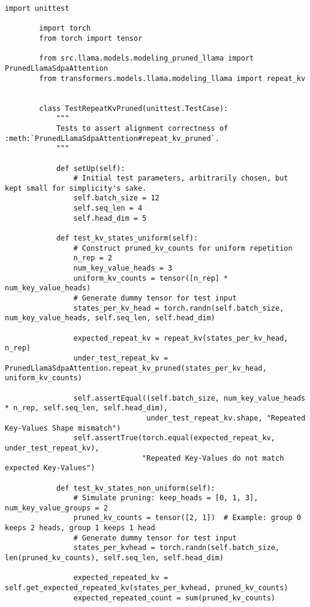 \documentclass{article}
\begin{document}
    \begin{lstlisting}[label={lst:repeat_kv_pruned}]
        import unittest

        import torch
        from torch import tensor

        from src.llama.models.modeling_pruned_llama import PrunedLlamaSdpaAttention
        from transformers.models.llama.modeling_llama import repeat_kv


        class TestRepeatKvPruned(unittest.TestCase):
            """
            Tests to assert alignment correctness of :meth:`PrunedLlamaSdpaAttention#repeat_kv_pruned`.
            """

            def setUp(self):
                # Initial test parameters, arbitrarily chosen, but kept small for simplicity's sake.
                self.batch_size = 12
                self.seq_len = 4
                self.head_dim = 5

            def test_kv_states_uniform(self):
                # Construct pruned_kv_counts for uniform repetition
                n_rep = 2
                num_key_value_heads = 3
                uniform_kv_counts = tensor([n_rep] * num_key_value_heads)
                # Generate dummy tensor for test input
                states_per_kv_head = torch.randn(self.batch_size, num_key_value_heads, self.seq_len, self.head_dim)

                expected_repeat_kv = repeat_kv(states_per_kv_head, n_rep)
                under_test_repeat_kv = PrunedLlamaSdpaAttention.repeat_kv_pruned(states_per_kv_head, uniform_kv_counts)

                self.assertEqual((self.batch_size, num_key_value_heads * n_rep, self.seq_len, self.head_dim),
                                 under_test_repeat_kv.shape, "Repeated Key-Values Shape mismatch")
                self.assertTrue(torch.equal(expected_repeat_kv, under_test_repeat_kv),
                                "Repeated Key-Values do not match expected Key-Values")

            def test_kv_states_non_uniform(self):
                # Simulate pruning: keep_heads = [0, 1, 3], num_key_value_groups = 2
                pruned_kv_counts = tensor([2, 1])  # Example: group 0 keeps 2 heads, group 1 keeps 1 head
                # Generate dummy tensor for test input
                states_per_kvhead = torch.randn(self.batch_size, len(pruned_kv_counts), self.seq_len, self.head_dim)

                expected_repeated_kv = self.get_expected_repeated_kv(states_per_kvhead, pruned_kv_counts)
                expected_repeated_count = sum(pruned_kv_counts)


\end{lstlisting}
\end{document}
